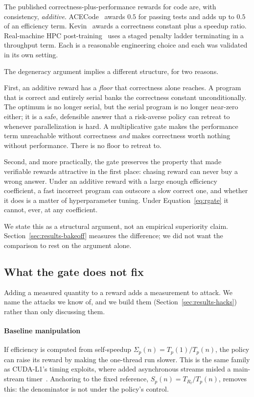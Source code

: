 The published correctness-plus-performance rewards for code are, with
consistency, \emph{additive}. ACECode~\cite{acecode} awards $0.5$ for passing
tests and adds up to $0.5$ of an efficiency term. Kevin~\cite{kevin} awards a
correctness constant plus a speedup ratio. Real-machine HPC
post-training~\cite{realmachine} uses a staged penalty ladder terminating in a
throughput term. Each is a reasonable engineering choice and each was validated
in its own setting.

The degeneracy argument implies a different structure, for two reasons.

First, an additive reward has a \emph{floor} that correctness alone reaches. A
program that is correct and entirely serial banks the correctness constant
unconditionally. The optimum is no longer serial, but the serial program is no
longer near-zero either; it is a safe, defensible answer that a
risk-averse policy can retreat to whenever parallelization is hard. A
multiplicative gate makes the performance term unreachable without correctness
\emph{and} makes correctness worth nothing without performance. There is no
floor to retreat to.

Second, and more practically, the gate preserves the property that made
verifiable rewards attractive in the first place: chasing reward can never buy
a wrong answer. Under an additive reward with a large enough efficiency
coefficient, a fast incorrect program can outscore a slow correct one, and
whether it does is a matter of hyperparameter tuning. Under
Equation~\eqref{eq:rgate} it cannot, ever, at any coefficient.

We state this as a structural argument, not an empirical superiority claim.
Section~\ref{sec:results-bakeoff} measures the difference; we did not want the
comparison to rest on the argument alone.

\subsection{What the gate does not fix}
\label{sec:reward-limits}

Adding a measured quantity to a reward adds a measurement to attack. We name
the attacks we know of, and we build them (Section~\ref{sec:results-hacks})
rather than only discussing them.

\paragraph*{Baseline manipulation}
If efficiency is computed from self-speedup $\Sigma_p(n) = T_p(1)/T_p(n)$, the
policy can raise its reward by making the one-thread run slower. This is the
same family as CUDA-L1's timing exploits, where added asynchronous streams
misled a main-stream timer~\cite{cudal1}. Anchoring to the fixed reference,
$S_p(n) = T_{R_t}/T_p(n)$, removes this: the denominator is not under the
policy's control.


